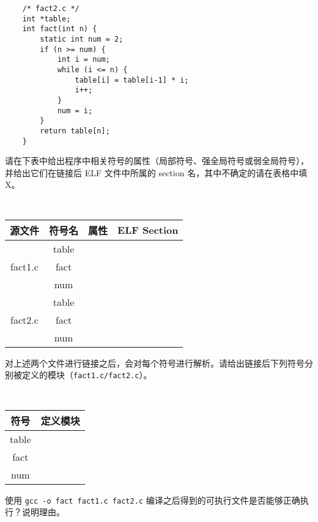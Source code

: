 \begin{problems}
\begin{verbatim}
    /* fact2.c */
    int *table;
    int fact(int n) {
        static int num = 2;
        if (n >= num) {
            int i = num;
            while (i <= n) {
                table[i] = table[i-1] * i;
                i++;
            }
            num = i;
        }
        return table[n];
    }
        \end{verbatim}
        \qn 请在下表中给出程序中相关符号的属性（局部符号、强全局符号或弱全局符号），并给出它们在链接后 ELF 文件中所属的 section 名，其中不确定的请在表格中填 X。
        \begin{table}[H]
            \tt
            \centering
            \begin{tabular}{|c|c|c|c|}
                \hline
                源文件 & 符号名 & {\qquad \qquad 属性 \qquad \qquad} & {\qquad \qquad ELF Section \qquad \qquad} \\ \hline
                \multirow{3}{*}{fact1.c} & table &  &  \\ \cline{2-4} 
                & fact &  &  \\ \cline{2-4} 
                & num &  &  \\ \hline
                \multirow{3}{*}{fact2.c} & table &  &  \\ \cline{2-4} 
                & fact &  &  \\ \cline{2-4} 
                & num &  &  \\ \hline
            \end{tabular}
        \end{table}
        \qn 对上述两个文件进行链接之后，会对每个符号进行解析。请给出链接后下列符号分别被定义的模块（\verb|fact1.c/fact2.c|）。
        \begin{table}[H]
            \tt
            \centering
            \begin{tabular}{|c|c|}
                \hline
                符号 & {\qquad \qquad 定义模块 \qquad \qquad} \\ \hline
                table &  \\ \hline
                fact &  \\ \hline
                num &  \\ \hline
            \end{tabular}
        \end{table}
        \qn 使用 \verb|gcc -o fact fact1.c fact2.c| 编译之后得到的可执行文件是否能够正确执行？说明理由。
    \end{problems}